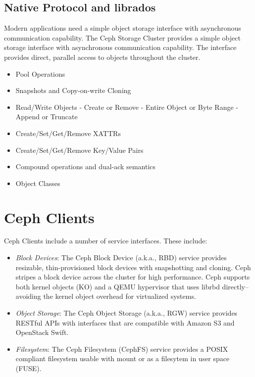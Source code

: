 \documentclass[12pt,a4paper]{report}
\begin{document}
\subsection{Native Protocol and librados}

Modern applications need a simple object storage interface with asynchronous
communication capability. The Ceph Storage Cluster provides a simple object
storage interface with asynchronous communication capability. The interface
provides direct, parallel access to objects throughout the cluster.

\begin{itemize}
	\item Pool Operations
	\item Snapshots and Copy-on-write Cloning
	\item Read/Write Objects - Create or Remove - Entire Object or Byte Range - Append or Truncate
	\item Create/Set/Get/Remove XATTRs
	\item Create/Set/Get/Remove Key/Value Pairs
	\item Compound operations and dual-ack semantics
	\item Object Classes
\end{itemize}

\section{Ceph Clients}
Ceph Clients include a number of service interfaces. These include:

\begin{itemize}
	\item \emph{Block Devices}: The Ceph Block Device (a.k.a., RBD) service
		provides resizable, thin-provisioned block devices with
		snapshotting and cloning. Ceph stripes a block device across
		the cluster for high performance. Ceph supports both kernel
		objects (KO) and a QEMU hypervisor that uses librbd
		directly–avoiding the kernel object overhead for virtualized
		systems.

	\item \emph{Object Storage}: The Ceph Object Storage (a.k.a., RGW)
		service provides RESTful APIs with interfaces that are
		compatible with Amazon S3 and OpenStack Swift.

	\item \emph{Filesystem}: The Ceph Filesystem (CephFS) service provides
		a POSIX compliant filesystem usable with mount or as a
		filesytem in user space (FUSE).
\end{itemize}
\end{document}
